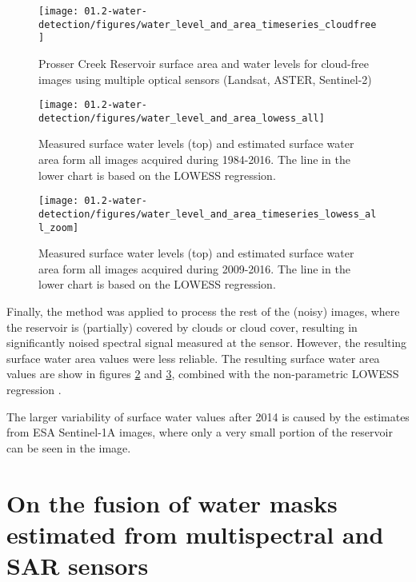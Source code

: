\begin{figure}[H]
	\centering
	\texttt{[image: 01.2-water-detection/figures/water\_level\_and\_area\_timeseries\_cloudfree]}
	\caption{Prosser Creek Reservoir surface area and water levels for cloud-free images using multiple optical sensors (Landsat, ASTER, Sentinel-2)}
	\label{fig:water_level_and_area_timeseries_cloudfree}
\end{figure}

\begin{figure}[H]
	\centering
	\texttt{[image: 01.2-water-detection/figures/water\_level\_and\_area\_lowess\_all]}
	\caption{Measured surface water levels (top) and estimated surface water area form all images acquired during 1984-2016. The line in the lower chart is based on the LOWESS regression.}
	\label{fig:water_level_and_area_timeseries_lowess_all}
\end{figure}

\begin{figure}[H]
	\centering
	\texttt{[image: 01.2-water-detection/figures/water\_level\_and\_area\_timeseries\_lowess\_all\_zoom]}
	\caption{Measured surface water levels (top) and estimated surface water area form all images acquired during 2009-2016. The line in the lower chart is based on the LOWESS regression.}
	\label{fig:water_level_and_area_timeseries_lowess_all_zoom}
\end{figure}

Finally, the method was applied to process the rest of the (noisy) images, where the reservoir is (partially) covered by clouds or cloud cover, resulting in significantly noised spectral signal measured at the sensor. However, the resulting surface water area values were less reliable. The resulting surface water area values are show in figures \ref{fig:water_level_and_area_timeseries_lowess_all} and \ref{fig:water_level_and_area_timeseries_lowess_all_zoom}, combined with the non-parametric LOWESS regression \citet{cleveland1979robust}. 

The larger variability of surface water values after 2014 is caused by the estimates from ESA Sentinel-1A images, where only a very small portion of the reservoir can be seen in the image.

\section{On the fusion of water masks estimated from multispectral and SAR sensors}

